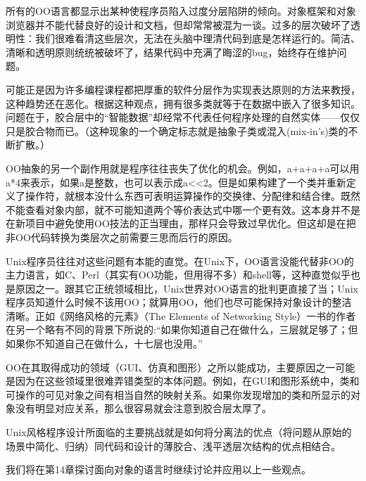 \documentclass[12pt,oneside]{book}
\begin{document}
\begin{common-format}
所有的OO语言都显示出某种使程序员陷入过度分层陷阱的倾向。对象框架和对象浏览器并不能代替良好的设计和文档，但却常常被混为一谈。过多的层次破坏了透明性：我们很难看清这些层次，无法在头脑中理清代码到底是怎样运行的。简洁、清晰和透明原则统统被破坏了，结果代码中充满了晦涩的bug，始终存在维护问题。

可能正是因为许多编程课程都把厚重的软件分层作为实现表达原则的方法来教授，这种趋势还在恶化。根据这种观点，拥有很多类就等于在数据中嵌入了很多知识。问题在于，胶合层中的“智能数据”却经常不代表任何程序处理的自然实体——仅仅只是胶合物而已。（这种现象的一个确定标志就是抽象子类或混入(mix-in's)类的不断扩散。）

OO抽象的另一个副作用就是程序往往丧失了优化的机会。例如，a+a+a+a可以用a*4来表示，如果a是整数，也可以表示成a<<2。但是如果构建了一个类并重新定义了操作符，就根本没什么东西可表明运算操作的交换律、分配律和结合律。既然不能查看对象内部，就不可能知道两个等价表达式中哪一个更有效。这本身并不是在新项目中避免使用OO技法的正当理由，那样只会导致过早优化。但这却是在把非OO代码转换为类层次之前需要三思而后行的原因。

Unix程序员往往对这些问题有本能的直觉。在Unix下，OO语言没能代替非OO的主力语言，如C、Perl（其实有OO功能，但用得不多）和shell等，这种直觉似乎也是原因之一。跟其它正统领域相比，Unix世界对OO语言的批判更直接了当；Unix程序员知道什么时候不该用OO；就算用OO，他们也尽可能保持对象设计的整洁清晰。正如《网络风格的元素》（The Elements of Networking Style）一书的作者在另一个略有不同的背景下所说的\cite{Padlipsky}:“如果你知道自己在做什么，三层就足够了；但如果你不知道自己在做什么，十七层也没用。”

OO在其取得成功的领域（GUI、仿真和图形）之所以能成功，主要原因之一可能是因为在这些领域里很难弄错类型的本体问题。例如，在GUI和图形系统中，类和可操作的可见对象之间有相当自然的映射关系。如果你发现增加的类和所显示的对象没有明显对应关系，那么很容易就会注意到胶合层太厚了。

Unix风格程序设计所面临的主要挑战就是如何将分离法的优点（将问题从原始的场景中简化、归纳）同代码和设计的薄胶合、浅平透层次结构的优点相结合。

我们将在第14章探讨面向对象的语言时继续讨论并应用以上一些观点。



\end{common-format}
\end{document}
